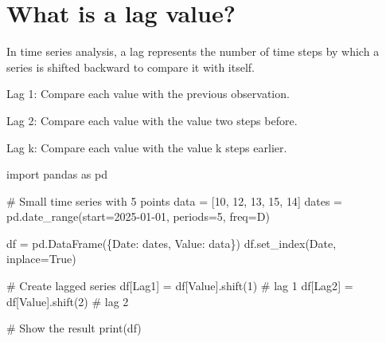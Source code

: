 \documentclass[
  11pt,
  a4paper,
]{report}
\newenvironment{Shaded}{\begin{snugshade}}{\end{snugshade}}
\newcommand{\BuiltInTok}[1]{\textcolor[rgb]{0.00,0.23,0.31}{#1}}
\newcommand{\CommentTok}[1]{\textcolor[rgb]{0.37,0.37,0.37}{#1}}
\newcommand{\DecValTok}[1]{\textcolor[rgb]{0.68,0.00,0.00}{#1}}
\newcommand{\ImportTok}[1]{\textcolor[rgb]{0.00,0.46,0.62}{#1}}
\newcommand{\NormalTok}[1]{\textcolor[rgb]{0.00,0.23,0.31}{#1}}
\newcommand{\OperatorTok}[1]{\textcolor[rgb]{0.37,0.37,0.37}{#1}}
\newcommand{\StringTok}[1]{\textcolor[rgb]{0.13,0.47,0.30}{#1}}
\newcommand{\VariableTok}[1]{\textcolor[rgb]{0.07,0.07,0.07}{#1}}
\begin{document}
\section{What is a lag value?}\label{what-is-a-lag-value}

In time series analysis, a lag represents the number of time steps by
which a series is shifted backward to compare it with itself.

Lag 1: Compare each value with the previous observation.

Lag 2: Compare each value with the value two steps before.

Lag k: Compare each value with the value k steps earlier.

\begin{Shaded}
\begin{Highlighting}[]
\ImportTok{import}\NormalTok{ pandas }\ImportTok{as}\NormalTok{ pd}

\CommentTok{\# Small time series with 5 points}
\NormalTok{data }\OperatorTok{=}\NormalTok{ [}\DecValTok{10}\NormalTok{, }\DecValTok{12}\NormalTok{, }\DecValTok{13}\NormalTok{, }\DecValTok{15}\NormalTok{, }\DecValTok{14}\NormalTok{]}
\NormalTok{dates }\OperatorTok{=}\NormalTok{ pd.date\_range(start}\OperatorTok{=}\StringTok{\textquotesingle{}2025{-}01{-}01\textquotesingle{}}\NormalTok{, periods}\OperatorTok{=}\DecValTok{5}\NormalTok{, freq}\OperatorTok{=}\StringTok{\textquotesingle{}D\textquotesingle{}}\NormalTok{)}

\NormalTok{df }\OperatorTok{=}\NormalTok{ pd.DataFrame(\{}\StringTok{\textquotesingle{}Date\textquotesingle{}}\NormalTok{: dates, }\StringTok{\textquotesingle{}Value\textquotesingle{}}\NormalTok{: data\})}
\NormalTok{df.set\_index(}\StringTok{\textquotesingle{}Date\textquotesingle{}}\NormalTok{, inplace}\OperatorTok{=}\VariableTok{True}\NormalTok{)}

\CommentTok{\# Create lagged series}
\NormalTok{df[}\StringTok{\textquotesingle{}Lag1\textquotesingle{}}\NormalTok{] }\OperatorTok{=}\NormalTok{ df[}\StringTok{\textquotesingle{}Value\textquotesingle{}}\NormalTok{].shift(}\DecValTok{1}\NormalTok{)  }\CommentTok{\# lag 1}
\NormalTok{df[}\StringTok{\textquotesingle{}Lag2\textquotesingle{}}\NormalTok{] }\OperatorTok{=}\NormalTok{ df[}\StringTok{\textquotesingle{}Value\textquotesingle{}}\NormalTok{].shift(}\DecValTok{2}\NormalTok{)  }\CommentTok{\# lag 2}

\CommentTok{\# Show the result}
\BuiltInTok{print}\NormalTok{(df)}
\end{Highlighting}
\end{Shaded}
\end{document}
